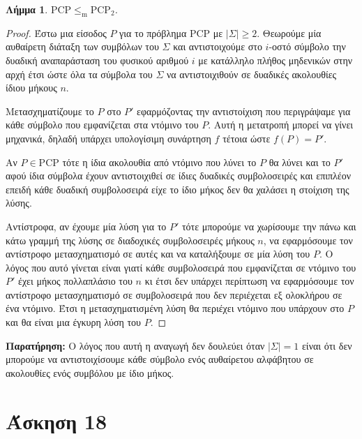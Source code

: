 \documentclass[a4paper, oneside, 11pt]{article}
\newcommand{\red}{\leq_{\text{m}}}
\newtheorem{lm}[thm]{Λήμμα}
\theoremstyle{definition}
\begin{document}
\begin{lm}
   $\text{PCP} \red\text{PCP}_2$.
\end{lm}
\begin{proof}
Έστω μια είσοδος $P$ για το πρόβλημα PCP με $|\Sigma| \geq 2$. Θεωρούμε μία αυθαίρετη
διάταξη των συμβόλων του $\Sigma$ και αντιστοιχούμε στο $i$-οστό σύμβολο την δυαδική
αναπαράσταση του φυσικού αριθμού $i$ με κατάλληλο πλήθος μηδενικών στην αρχή έτσι
ώστε όλα τα σύμβολα του $\Sigma$ να αντιστοιχιθούν σε δυαδικές ακολουθίες ίδιου
μήκους $n$.

Μετασχηματίζουμε το $P$ στο $P'$ εφαρμόζοντας την αντιστοίχιση που περιγράψαμε για
κάθε σύμβολο που εμφανίζεται στα ντόμινο του $P$. Αυτή η μετατροπή μπορεί να γίνει
μηχανικά, δηλαδή υπάρχει υπολογίσιμη συνάρτηση $f$ τέτοια ώστε $f(P) = P'$.

Αν $P \in \text{PCP}$ τότε η ίδια ακολουθία από ντόμινο που λύνει το $P$ θα λύνει και
το $P'$ αφού ίδια σύμβολα έχουν αντιστοιχιθεί σε ίδιες δυαδικές συμβολοσειρές και
επιπλέον επειδή κάθε δυαδική συμβολοσειρά είχε το ίδιο μήκος δεν θα χαλάσει η
στοίχιση της λύσης.

Αντίστροφα, αν έχουμε μία λύση για το $P'$ τότε μπορούμε να χωρίσουμε την πάνω και
κάτω γραμμή της λύσης σε διαδοχικές συμβολοσειρές μήκους $n$, να εφαρμόσουμε τον
αντίστροφο μετασχηματισμό σε αυτές και να καταλήξουμε σε μία λύση του $P$. Ο λόγος
που αυτό γίνεται είναι γιατί κάθε συμβολοσειρά που εμφανίζεται σε ντόμινο του $P'$
έχει μήκος πολλαπλάσιο του $n$ κι έτσι δεν υπάρχει περίπτωση να εφαρμόσουμε τον
αντίστροφο μετασχηματισμό σε συμβολοσειρά που δεν περιέχεται εξ ολοκλήρου σε ένα
ντόμινο. Έτσι η μετασχηματισμένη λύση θα περιέχει ντόμινο που υπάρχουν στο $P$ και θα
είναι μια έγκυρη λύση του $P$.
\end{proof}

\textbf{Παρατήρηση:} Ο λόγος που αυτή η αναγωγή δεν δουλεύει όταν $|\Sigma|=1$ είναι
ότι δεν μπορούμε να αντιστοιχίσουμε κάθε σύμβολο ενός αυθαίρετου αλφάβητου σε
ακολουθίες ενός συμβόλου με ίδιο μήκος.

\section*{Άσκηση 18}
\end{document}
